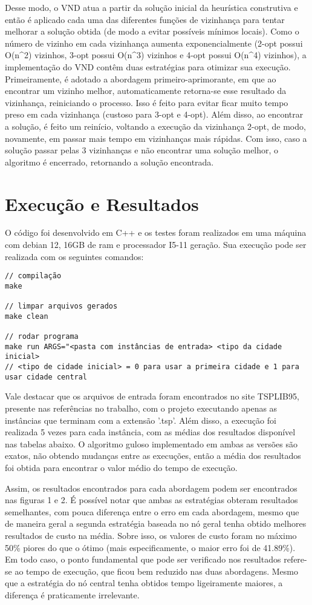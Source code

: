 \documentclass[10pt]{extarticle} %
\begin{document}
Desse modo, o VND atua a partir da solução inicial da heurística construtiva e então é aplicado cada uma das diferentes funções de vizinhança para tentar melhorar a solução obtida (de modo a evitar possíveis mínimos locais). Como o número de vizinho em cada vizinhança aumenta exponencialmente (2-opt possui O(n^2) vizinhos, 3-opt possui O(n^3) vizinhos e 4-opt possui O(n^4) vizinhos), a implementação do VND contêm duas estratégias para otimizar sua execução. Primeiramente, é adotado a abordagem primeiro-aprimorante, em que ao encontrar um vizinho melhor, automaticamente retorna-se esse resultado da vizinhança, reiniciando o processo. Isso é feito para evitar ficar muito tempo preso em cada vizinhança (custoso para 3-opt e 4-opt). Além disso, ao encontrar a solução, é feito um reinício, voltando a execução da vizinhança 2-opt, de modo, novamente, em passar mais tempo em vizinhanças mais rápidas. Com isso, caso a solução passar pelas 3 vizinhanças e não encontrar uma solução melhor, o algoritmo é encerrado, retornando a solução encontrada.

\section{Execução e Resultados}

O código foi desenvolvido em C++ e os testes foram realizados em uma máquina com debian 12, 16GB de ram e processador I5-11 geração. Sua execução pode ser realizada com os seguintes comandos:

\begin{verbatim}
// compilação
make

// limpar arquivos gerados
make clean

// rodar programa
make run ARGS="<pasta com instâncias de entrada> <tipo da cidade inicial>
// <tipo de cidade inicial> = 0 para usar a primeira cidade e 1 para usar cidade central
\end{verbatim}

Vale destacar que os arquivos de entrada foram encontrados no site TSPLIB95, presente nas referências no trabalho, com o projeto executando apenas as instâncias que terminam com a extensão '.tsp'. Além disso, a execução foi realizada 5 vezes para cada instância, com as médias dos resultados disponível nas tabelas abaixo. O algoritmo guloso implementado em ambas as versões são exatos, não obtendo mudanças entre as execuções, então a média dos resultados foi obtida para encontrar o valor médio do tempo de execução.

Assim, os resultados encontrados para cada abordagem podem ser encontrados nas figuras 1 e 2. É possível notar que ambas as estratégias obteram resultados semelhantes, com pouca diferença entre o erro em cada abordagem, mesmo que de maneira geral a segunda estratégia baseada no nó geral tenha obtido melhores resultados de custo na média. Sobre isso, os valores de custo foram no máximo 50\% piores do que o ótimo (mais especificamente, o maior erro foi de 41.89\%). Em todo caso, o ponto fundamental que pode ser verificado nos resultados refere-se ao tempo de execução, que ficou bem reduzido nas duas abordagens. Mesmo que a estratégia do nó central tenha obtidos tempo ligeiramente maiores, a diferença é praticamente irrelevante.
\end{document}
